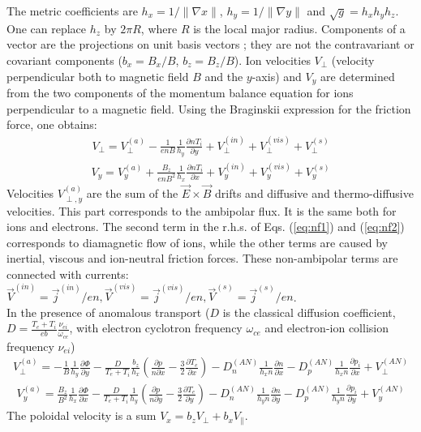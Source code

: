 \documentclass[a4paper,10pt]{report}
\newcommand{\grad}{\nabla}
\begin{document}
The metric coefficients are
$h_x=1/\|\grad x\|$, $h_y=1/\|\grad y\|$ and $\sqrt{g}=h_xh_yh_z$.
One can replace $h_z$ by $2 \pi R$,
where $R$ is the local major radius.  Components of a vector are the
projections on unit basis vectors
; they are not the contravariant or
covariant components ($b_x = B_x/B$, $b_z = B_z/B$).
Ion velocities $V_{\perp}$ (velocity perpendicular both
to magnetic field $B$ and the $y$-axis) and $V_y$ are
determined from the two components of the momentum balance equation
for ions perpendicular to a magnetic field. Using the Braginskii expression
for the friction force, one obtains:\\
\begin{gather}
\label{eq:nf1}
V_{\perp} = V_{\perp}^{\left( a \right)} - \frac{1}{enB}
\frac{1}{h_y}\frac{\partial nT_i}{\partial y} +
V_{\perp}^{\left( in \right)} + V_{\perp}^{\left( vis \right)} +
V_{\perp}^{\left( s \right)}
\end{gather}
\begin{gather}
\label{eq:nf2}
V_y = V_y^{\left( a \right)} + \frac{B_z}{enB^2}
\frac{1}{h_x}\frac{\partial nT_i}{\partial x} +
V_y^{\left( in \right)} + V_y^{\left( vis \right)} +
V_y^{\left( s \right)}
\end{gather}
Velocities $V_{\perp,y}^{\left( a \right)}$ are the sum of the
$\vec{E} \times \vec{B}$ drifts and diffusive and thermo-diffusive
velocities.
This part corresponds to the ambipolar flux. It is the same both for ions and
electrons.
The second term in the r.h.s. of
Eqs. (\ref{eq:nf1}) and (\ref{eq:nf2})
corresponds to diamagnetic flow of ions, while the other terms are caused
by inertial, viscous and ion-neutral friction forces.
These non-ambipolar terms are
connected with currents: $\vec{V}^{\left( in \right)} = \vec{j}^{\left( in \right)}/en,
\vec{V}^{\left( vis \right)} = \vec{j}^{\left( vis \right)}/en,
\vec{V}^{\left( s \right)} = \vec{j}^{\left( s \right)}/en$.\\
In the presence of anomalous transport
($D$ is the classical diffusion coefficient, $D=\frac{T_e+T_i}{eb}
\frac{\nu_{ei}}{\omega_{ce}}$, with electron cyclotron frequency
$\omega_{ce}$ and electron-ion collision frequency $\nu_{ei}$)
\begin{gather}
\label{eq:nf3}
V_{\perp}^{\left( a \right)} =
- \frac{1}{B}\frac{1}{h_y}\frac{\partial \Phi}{\partial y}
-\frac{D}{T_e+T_i} \frac{b_z}{h_x}\left(\frac{\partial p}{n \partial x}
-\frac{3}{2}\frac{\partial T_e}{\partial x}\right)
-D^{(AN)}_n\frac{1}{h_x n} \frac{\partial n}{\partial x}
-D^{(AN)}_p\frac{1}{h_x n} \frac{\partial p_i}{\partial x}
+V_{\perp}^{\left( AN \right)}
\end{gather}
\begin{gather}
\label{eq:nf44}
V_y^{\left( a \right)} =
\frac{B_z}{B^2}\frac{1}{h_x}\frac{\partial \Phi}{\partial x}
-\frac{D}{T_e+T_i} \frac{1}{h_y}\left(\frac{\partial p}{n \partial y}
-\frac{3}{2}\frac{\partial T_e}{\partial y}\right)
-D^{(AN)}_n\frac{1}{h_y n} \frac{\partial n}{\partial y}
-D^{(AN)}_p\frac{1}{h_y n} \frac{\partial p_i}{\partial y}
+V_y^{\left( AN \right)}
\end{gather}
The poloidal velocity is a sum $V_x = b_z V_{\perp} + b_x V_{\parallel}$.
\end{document}
